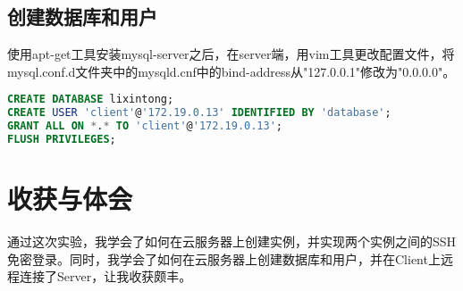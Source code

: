 \documentclass{IEEEconf}
\begin{document}
\subsection{创建数据库和用户}

使用apt-get工具安装mysql-server之后，在server端，用vim工具更改配置文件，将mysql.conf.d文件夹中的mysqld.cnf中的bind-address从"127.0.0.1"修改为"0.0.0.0"。

\begin{lstlisting}[language=sql]
CREATE DATABASE lixintong;
CREATE USER 'client'@'172.19.0.13' IDENTIFIED BY 'database';
GRANT ALL ON *.* TO 'client'@'172.19.0.13';
FLUSH PRIVILEGES;
\end{lstlisting}

\section{收获与体会}

通过这次实验，我学会了如何在云服务器上创建实例，并实现两个实例之间的SSH免密登录。同时，我学会了如何在云服务器上创建数据库和用户，并在Client上远程连接了Server，让我收获颇丰。
\end{document}
